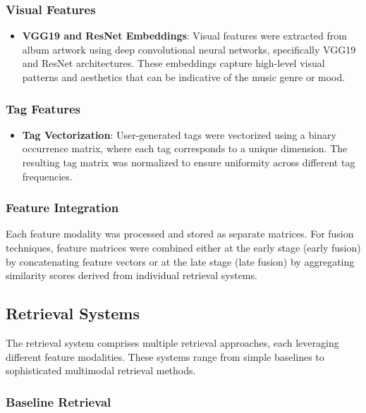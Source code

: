 \documentclass[sigconf]{acmart}
\begin{document}
\subsubsection{Visual Features}

\begin{itemize}
    \item \textbf{VGG19 and ResNet Embeddings}: Visual features were extracted from album artwork using deep convolutional neural networks, specifically VGG19 and ResNet architectures. These embeddings capture high-level visual patterns and aesthetics that can be indicative of the music genre or mood.
\end{itemize}

\subsubsection{Tag Features}

\begin{itemize}
    \item \textbf{Tag Vectorization}: User-generated tags were vectorized using a binary occurrence matrix, where each tag corresponds to a unique dimension. The resulting tag matrix was normalized to ensure uniformity across different tag frequencies.
\end{itemize}

\subsubsection{Feature Integration}

Each feature modality was processed and stored as separate matrices. For fusion techniques, feature matrices were combined either at the early stage (early fusion) by concatenating feature vectors or at the late stage (late fusion) by aggregating similarity scores derived from individual retrieval systems.

\subsection{Retrieval Systems}
\label{subsec:retrieval_systems}

The retrieval system comprises multiple retrieval approaches, each leveraging different feature modalities. These systems range from simple baselines to sophisticated multimodal retrieval methods.

\subsubsection{Baseline Retrieval}
\end{document}
